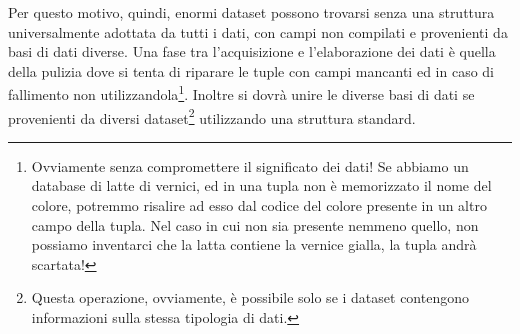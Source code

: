 Per questo motivo, quindi, enormi dataset possono trovarsi senza una struttura universalmente adottata da tutti i dati, con campi non compilati e provenienti da basi di dati diverse. Una fase tra l'acquisizione e l'elaborazione dei dati è quella della pulizia dove si tenta di riparare le tuple con campi mancanti ed in caso di fallimento non utilizzandola\footnote{Ovviamente senza compromettere il significato dei dati! Se abbiamo un database di latte di vernici, ed in una tupla non è memorizzato il nome del colore, potremmo risalire ad esso dal codice del colore presente in un altro campo della tupla. Nel caso in cui non sia presente nemmeno quello, non possiamo inventarci che la latta contiene la vernice gialla, la tupla andrà scartata!}. Inoltre si dovrà unire le diverse basi di dati se provenienti da diversi dataset\footnote{Questa operazione, ovviamente, è possibile solo se i dataset contengono informazioni sulla stessa tipologia di dati.} utilizzando una struttura standard.
